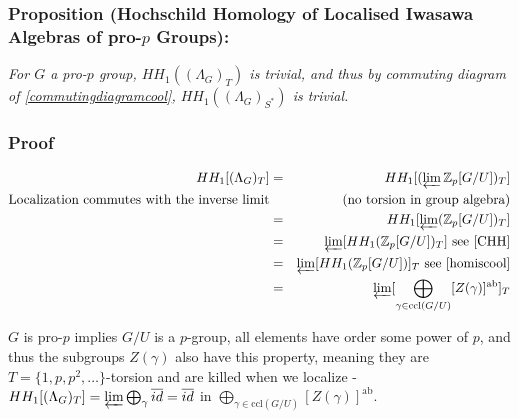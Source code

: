 \subsubsection{Proposition (Hochschild Homology of Localised Iwasawa Algebras of pro-$p$ Groups):}
\emph{For $G$ a pro-$p$ group, $HH_1((\Lambda_G)_T)$ is trivial, and thus by commuting diagram of \ref{commutingdiagramcool}, $HH_1((\Lambda_G)_{S^*})$ is trivial.}

\subsubsection*{Proof}
\begin{eqnarray}
\nonumber HH_1[(\Lambda_G)_T]   &=& HH_1[ (\varprojlim \mathbb Z_p [G/U])_T ] \\
\nonumber \text{Localization commutes with the inverse limit} && \text{(no torsion in group algebra)}\\
\nonumber     						&=& HH_1[\varprojlim ( \mathbb Z_p [G/U])_T] \\
\nonumber     						&=& \varprojlim [HH_1( \mathbb Z_p [G/U])_T] \text{ see } \ref{CHH} \\
\nonumber     						&=& \varprojlim [HH_1( \mathbb Z_p [G/U])]_T \text{ see } \ref{homiscool}\\
\nonumber						&=& \varprojlim [\bigoplus_{\gamma\in\text{ccl}(G/U)}[Z(\gamma)]^{\text{ab}}]_T
\end{eqnarray}

$G$ is pro-$p$ implies $G/U$ is a $p$-group, all elements have order some power of $p$, and thus the subgroups $Z(\gamma)$ also have this property, meaning they are $T=\{1,p,p^2,\dots \}$-torsion and are killed when we localize - $HH_1[(\Lambda_G)_T]  = \varprojlim \bigoplus_\gamma \overline{id} = \overline {id}$ in $\bigoplus_{\gamma\in\text{ccl}(G/U)}[Z(\gamma)]^{\text{ab}}$.







